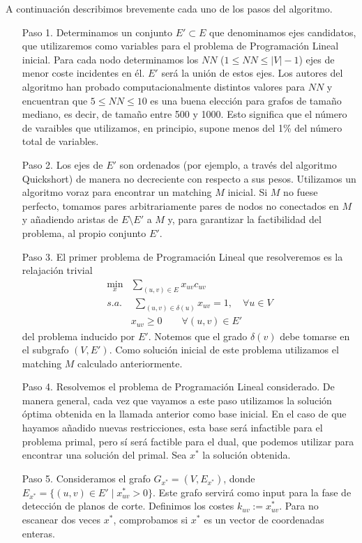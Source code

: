 \documentclass[twoside,a4paper,openright,12pt,tikz]{book}
\begin{document}
A continuación describimos brevemente cada uno de los pasos del algoritmo.
\begin{itemize}
\item[Paso 1.] Determinamos un conjunto $E'\subset E$ que denominamos ejes candidatos, que utilizaremos como variables para el problema de Programación Lineal inicial. Para cada nodo determinamos los $NN$ ($1\leq NN \leq |V|-1$) ejes de menor coste incidentes en él. $E'$ será la unión de estos ejes. Los autores del algoritmo han probado computacionalmente distintos valores para $NN$ y encuentran que $5\leq NN \leq 10$ es una buena elección para grafos de tamaño mediano, es decir, de tamaño entre 500 y 1000. Esto significa que el número de varaibles que utilizamos, en principio, supone menos del 1\% del número total de variables. 
\item[Paso 2.] Los ejes de $E'$ son ordenados (por ejemplo, a través del algoritmo Quickshort) de manera no decreciente con respecto a sus pesos. Utilizamos un algoritmo voraz para encontrar un matching $M$ inicial. Si $M$ no fuese perfecto, tomamos pares arbitrariamente pares de nodos no conectados en $M$ y añadiendo aristas de $E\setminus E'$ a $M$ y, para garantizar la factibilidad del problema, al propio conjunto $E'$. 
\item[Paso 3.] El primer problema de Programación Lineal que resolveremos es la relajación trivial 
\begin{align*}
\min_x & \sum_{(u,v) \in E}x_{uv}c_{uv}\\
s.a.&\;\sum_{(u,v)\in\delta(u)} x_{uv} = 1, \quad \forall u \in V\\
&x_{uv} \geq 0 \qquad \forall(u,v)\in E'
\end{align*}
del problema inducido por $E'$. Notemos que el grado $\delta(v)$ debe tomarse en el subgrafo $(V,E')$. Como solución inicial de este problema utilizamos el matching $M$ calculado anteriormente.
\newpage
\item[Paso 4.] Resolvemos el problema de Programación Lineal considerado. De manera general, cada vez que vayamos a este paso utilizamos la solución óptima obtenida en la llamada anterior como base inicial. En el caso de que hayamos añadido nuevas restricciones, esta base será infactible para el problema primal, pero sí será factible para el dual, que podemos utilizar para encontrar una solución del primal. Sea $x^*$ la solución obtenida.
\item[Paso 5.] Consideramos el grafo $G_{x^*}=(V,E_{x^*})$, donde $E_{x^*} =\{(u,v)\in E'\mid x^*_{uv}>0\}$. Este grafo servirá como input para la fase de detección de planos de corte. Definimos los costes $k_{uv}:=x^*_{uv}$. Para no escanear dos veces $x^*$, comprobamos si $x^*$ es un vector de coordenadas enteras.

\end{itemize}
\end{document}
